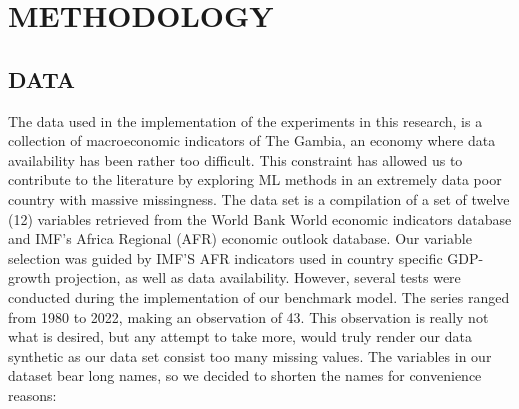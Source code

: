 \documentclass[12pt,italian, twoside]{report}
\begin{document}
% 
% 

\chapter{METHODOLOGY}
\label{cap4}

\section{DATA}

The data used in the implementation of the experiments in this research, is a collection of macroeconomic indicators of The Gambia, an economy where data availability has been rather too difficult. This constraint has allowed us to contribute to the literature by exploring ML methods in an extremely data poor country with massive missingness. The data set is a compilation of a set of twelve (12) variables retrieved from the World Bank World economic indicators database and IMF’s Africa Regional (AFR) economic outlook database. Our variable selection was guided by IMF’S AFR indicators used in country specific GDP-growth projection, as well as data availability. However, several tests were conducted during the implementation of our benchmark model. The series ranged from 1980 to 2022, making an observation of 43. This observation is really not what is desired, but any attempt to take more, would truly render our data synthetic as our data set consist too many missing values. The variables in our dataset bear long names, so we decided to shorten the names for convenience reasons{:}\\
\end{document}
